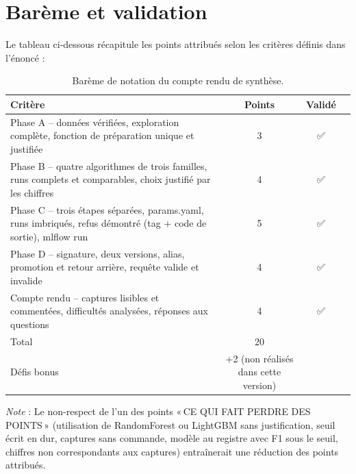 \documentclass[12pt,a4paper]{report}
\begin{document}
\chapter*{Barème et validation}

Le tableau ci‑dessous récapitule les points attribués selon les critères définis dans l'énoncé :

\begin{table}[h!]
    \centering
    \begin{tabular}{lccc}
        \toprule
        \textbf{Critère} & \textbf{Points} & \textbf{Validé} \\
        \midrule
        Phase A – données vérifiées, exploration complète, fonction de préparation unique et justifiée & 3 & ✅ \\
        Phase B – quatre algorithmes de trois familles, runs complets et comparables, choix justifié par les chiffres & 4 & ✅ \\
        Phase C – trois étapes séparées, params.yaml, runs imbriqués, refus démontré (tag + code de sortie), mlflow run & 5 & ✅ \\
        Phase D – signature, deux versions, alias, promotion et retour arrière, requête valide et invalide & 4 & ✅ \\
        Compte rendu – captures lisibles et commentées, difficultés analysées, réponses aux questions & 4 & ✅ \\
        Total & 20 & \\
        Défis bonus & +2 (non réalisés dans cette version) & \\
        \bottomrule
    \end{tabular}
    \caption{Barème de notation du compte rendu de synthèse.}
    \label{tab:bareme}
\end{table}

\textit{Note} : Le non-respect de l'un des points « CE QUI FAIT PERDRE DES POINTS » (utilisation de RandomForest ou LightGBM sans justification, seuil écrit en dur, captures sans commande, modèle au registre avec F1 sous le seuil, chiffres non correspondants aux captures) entraînerait une réduction des points attribués.
\end{document}

